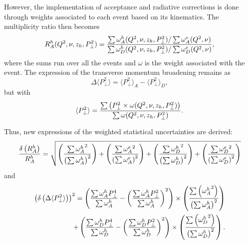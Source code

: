 However, the implementation of acceptance and radiative corrections is done through weights associated to each event based on its kinematics. The multiplicity ratio then becomes
\begin{equation}
R_A^h (Q^2,\nu,z_h,P_\perp^2) = {{\sum \omega_A^h (Q^2,\nu,z_h,P_\perp^2) / \sum \omega_A^e (Q^2,\nu)} 
                       \over {\sum \omega_D^h (Q^2,\nu,z_h,P_\perp^2) / \sum \omega_D^e (Q^2,\nu)}},
\end{equation}
where the sums run over all the events and $\omega$ is the weight associated with the event. The expression of the transverse momentum broadening remains as
\begin{equation}
\Delta \langle P_\perp^2 \rangle = \langle P_\perp^2 \rangle_A - \langle P_\perp^2 \rangle_D,
\end{equation}
but with
\begin{equation}
\langle P_\perp^2 \rangle = {\sum \left ( P_\perp^2 \times \omega (Q^2,\nu,z_h,P_\perp^2) \right ) \over \sum \omega (Q^2,\nu,z_h,P_\perp^2)}.
\end{equation}

Thus, new expressions of the weighted statistical uncertainties are derived: 
\begin{equation}
{\delta \left ( R_A^h \right ) \over R_A^h} = 
      \sqrt{ \left ( {\sum {\omega^h_A}^2 \over \left (\sum \omega^h_A \right )^2} \right ) 
           + \left ( {\sum {\omega^e_A}^2 \over \left (\sum \omega^e_A \right )^2} \right ) 
           + \left ( {\sum {\omega^h_D}^2 \over \left (\sum \omega^h_D \right )^2} \right ) 
           + \left ( {\sum {\omega^e_D}^2 \over \left (\sum \omega^e_D \right )^2} \right ) }
\end{equation}
 and 
\begin{equation}
\begin{split}
\left ( \delta \left ( \Delta \langle P_\perp^2 \rangle \right ) \right )^2 = 
   \left ({{\sum \omega^h_A P_\perp^4 }\over{\sum \omega^h_A}} - \left ({\sum \omega^h_A P_\perp^2 }\over{\sum \omega^h_A}\right )^2 \right ) 
         \times \left ( {\sum \left ( {\omega^h_A}^2 \right ) \over \left ( \sum \omega^h_A \right ) ^2 }\right ) \\
 + \left ({{\sum \omega^h_D P_\perp^4 }\over{\sum \omega^h_D}} - \left ({\sum \omega^h_D P_\perp^2 }\over{\sum \omega^h_D}\right )^2 \right ) 
	 \times \left ( {\sum \left ( {\omega^h_D}^2 \right ) \over \left ( \sum \omega^h_D \right ) ^2 }\right ).
\end{split}
\end{equation}


